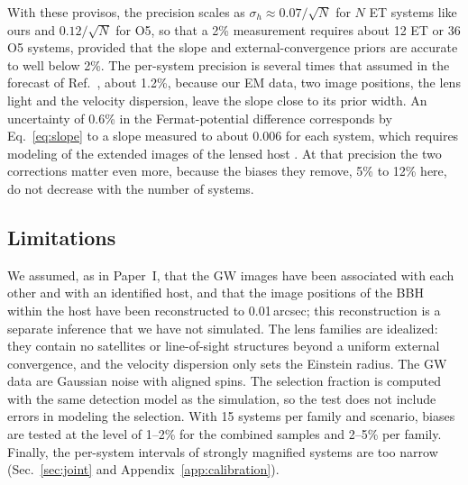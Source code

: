 With these provisos, the precision scales as $\sigma_h\approx0.07/\sqrt N$ for $N$ ET systems like ours and $0.12/\sqrt N$ for O5, so that a 2\% measurement requires about 12 ET or 36 O5 systems, provided that the slope and external-convergence priors are accurate to well below 2\%. The per-system precision is several times that assumed in the forecast of Ref.~\citep{liao2017precision}, about 1.2\%, because our EM data, two image positions, the lens light and the velocity dispersion, leave the slope close to its prior width. An uncertainty of 0.6\% in the Fermat-potential difference corresponds by Eq.~\eqref{eq:slope} to a slope measured to about 0.006 for each system, which requires modeling of the extended images of the lensed host \citep{hannuksela2020localizing,wempe2022lensing}. At that precision the two corrections matter even more, because the biases they remove, 5\% to 12\% here, do not decrease with the number of systems.

\subsection{Limitations}
\label{sec:limitations}
We assumed, as in Paper~I, that the GW images have been associated with each other and with an identified host, and that the image positions of the BBH within the host have been reconstructed to 0.01\,arcsec; this reconstruction is a separate inference that we have not simulated. The lens families are idealized: they contain no satellites or line-of-sight structures beyond a uniform external convergence, and the velocity dispersion only sets the Einstein radius. The GW data are Gaussian noise with aligned spins. The selection fraction is computed with the same detection model as the simulation, so the test does not include errors in modeling the selection. With 15 systems per family and scenario, biases are tested at the level of 1--2\% for the combined samples and 2--5\% per family. Finally, the per-system intervals of strongly magnified systems are too narrow (Sec.~\ref{sec:joint} and Appendix~\ref{app:calibration}).

